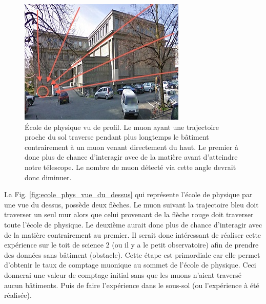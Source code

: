 \documentclass[12pt]{article}
\begin{document}
\begin{figure}[htpb!]
    \centering
    \includegraphics[width=0.6\linewidth]{graphiques/experience2/gmap_ecole_de_phys_vu_prof.jpg}
    \captionsetup{width=0.7\textwidth}
    \caption{École de physique vu de profil. Le muon ayant une trajectoire proche du sol traverse pendant plus longtemps le bâtiment contrairement à un muon venant directement du haut. Le premier à donc plus de chance d'interagir avec de la matière avant d'atteindre notre télescope. Le nombre de muon détecté via cette angle devrait donc diminuer.}
    \label{fig:ecole_phys_vue_du_prof}
\end{figure}

La Fig. \ref{fig:ecole_phys_vue_du_dessus} qui représente l'école de physique par une vue du dessus, possède deux flèches. Le muon suivant la trajectoire bleu doit traverser un seul mur alors que celui provenant de la flèche rouge doit traverser toute l'école de physique. Le deuxième aurait donc plus de chance d'interagir avec de la matière contrairement au premier. Il serait donc intéressant de réaliser cette expérience sur le toit de science 2 (ou il y a le petit observatoire) afin de prendre des données sans bâtiment (obstacle). Cette étape est primordiale car elle permet d'obtenir le taux de comptage muonique au sommet de l'école de physique. Ceci  donnerai une valeur de comptage initial sans que les muons n'aient traversé aucun bâtiments. Puis de faire l'expérience dans le sous-sol (ou l'expérience à été réalisée).
\end{document}
